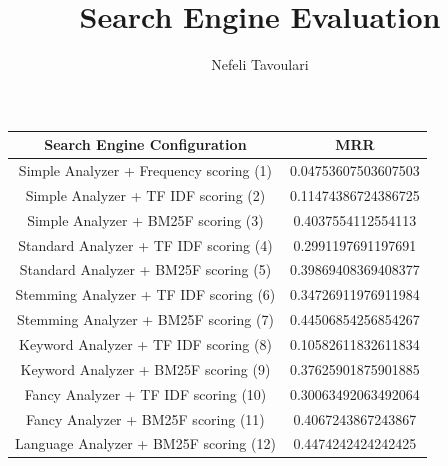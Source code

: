 \documentclass{article}
\title{Search Engine Evaluation}
\author{Nefeli Tavoulari}
\begin{document}
\maketitle

\section{}
    \begin{table}[h!]
    \centering
    \begin{tabular}{||c || c||} 
    \hline

    Search Engine Configuration &  MRR \\ [0.8ex] 
    \hline\hline
    Simple Analyzer + Frequency scoring (1) &  0.04753607503607503\\
    Simple Analyzer + TF IDF scoring (2) &  0.11474386724386725\\ 
    Simple Analyzer + BM25F scoring (3)  &  0.4037554112554113\\ 
    Standard Analyzer + TF IDF scoring (4) & 0.2991197691197691 \\
    Standard Analyzer + BM25F scoring (5) & 0.39869408369408377 \\
    Stemming Analyzer + TF IDF scoring (6) & 0.34726911976911984 \\
    Stemming Analyzer + BM25F scoring (7) & 0.44506854256854267 \\
    Keyword Analyzer + TF IDF scoring (8) & 0.10582611832611834 \\
    Keyword Analyzer + BM25F scoring (9) & 0.37625901875901885 \\
    Fancy Analyzer + TF IDF scoring (10) & 0.30063492063492064 \\
    Fancy Analyzer + BM25F scoring (11) & 0.4067243867243867 \\
    Language Analyzer + BM25F scoring (12) & 0.4474242424242425\\ 
     \hline
    \end{tabular}
    \end{table}
\end{document}
